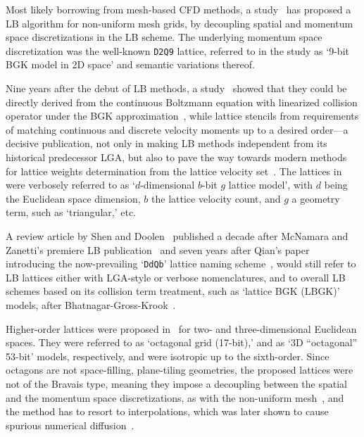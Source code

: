     Most likely borrowing from mesh-based CFD methods, a study~\cite{1996-HeX+DemboM-JComputPhys} has proposed  a  LB  algorithm
    for non-uniform mesh grids, by decoupling spatial and momentum space  discretizations  in  the  LB  scheme.  The  underlying
    momentum space discretization was the well-known \texttt{D2Q9} lattice, referred to in the study as `9-bit BGK model  in  2D
    space' and semantic variations thereof.

    Nine years after the debut of LB methods, a study~\cite{1997-HeX+LuoLS-PhysRevE} showed that they could be directly  derived
    from    the    continuous    Boltzmann    equation    with    linearized    collision     operator     under     the     BGK
    approximation~\cite{2011-HarrisS-Dover}, while lattice stencils  from  requirements  of  matching  continuous  and  discrete
    velocity moments up to a desired order---a decisive publication,  not  only  in  making  LB  methods  independent  from  its
    historical predecessor LGA, but also to pave the way towards modern methods  for  lattice  weights  determination  from  the
    lattice  velocity  set~\cite{2014-MattilaKK+PhilippiPC-SciWorldJ}.  The  lattices   in~\cite{1997-HeX+LuoLS-PhysRevE}   were
    verbosely referred to as `$d$-dimensional $b$-bit $g$ lattice model', with $d$ being the Euclidean space dimension, $b$  the
    lattice velocity count, and $g$ a geometry term, such as `triangular,' etc.

    A review article by Shen and  Doolen~\cite{1998-ChenS+DoolenGD-AnnuRevFluidMech}  published  a  decade  after  McNamara  and
    Zanetti's premiere LB publication~\cite{1988-McNamaraGR+ZanettiG-PhysRevLett} and seven years after Qian's paper introducing
    the now-prevailing `\texttt{DdQb}' lattice naming scheme~\cite{1991-QianYH+LallemandP-AdvKinTheoContMech}, would still refer
    to LB lattices either with LGA-style or verbose nomenclatures, and to  overall  LB  schemes  based  on  its  collision  term
    treatment,  such  as  `lattice  BGK  (LBGK)'  models,   after   Bhatnagar-Gross-Krook~\cite{1954-BhatnagarPL+KrookM-PhysRev,
    2003-LiboffRL-bookSpringer, 2011-HarrisS-Dover}.

    Higher-order lattices were proposed  in~\cite{1998-PavloP+VahalaL-PhysRevLett}  for  two-  and  three-dimensional  Euclidean
    spaces. They were referred to as `octagonal grid (17-bit),' and as `3D ``octagonal'' 53-bit' models, respectively, and  were
    isotropic up to the sixth-order. Since octagons are not space-filling, plane-tiling geometries, the proposed  lattices  were
    not of the Bravais type, meaning they impose a decoupling between the spatial and the  momentum  space  discretizations,  as
    with the non-uniform mesh~\cite{1996-HeX+DemboM-JComputPhys}, and the method has to  resort  to  interpolations,  which  was
    later shown to cause spurious numerical diffusion~\cite[p.~429]{2006-ShanX+ChenH-JFluidMech}.

